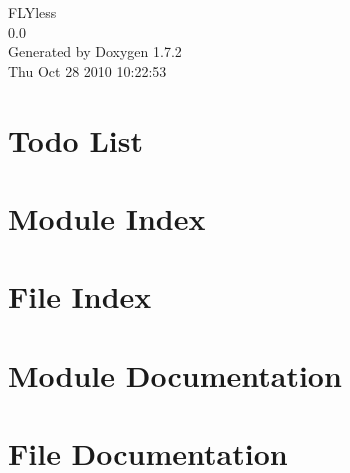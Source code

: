 \documentclass[a4paper]{book}
\begin{document}
\hypersetup{pageanchor=false}
\begin{titlepage}
\vspace*{7cm}
\begin{center}
{\Large FLYless \\[1ex]\large 0.0 }\\
\vspace*{1cm}
{\large Generated by Doxygen 1.7.2}\\
\vspace*{0.5cm}
{\small Thu Oct 28 2010 10:22:53}\\
\end{center}
\end{titlepage}
\clearemptydoublepage
{}
\tableofcontents
\clearemptydoublepage
{}
\hypersetup{pageanchor=true}
\chapter{Todo List}
\label{todo}
\hypertarget{todo}{}

\chapter{Module Index}

\chapter{File Index}

\chapter{Module Documentation}




\chapter{File Documentation}




\printindex
\end{document}
